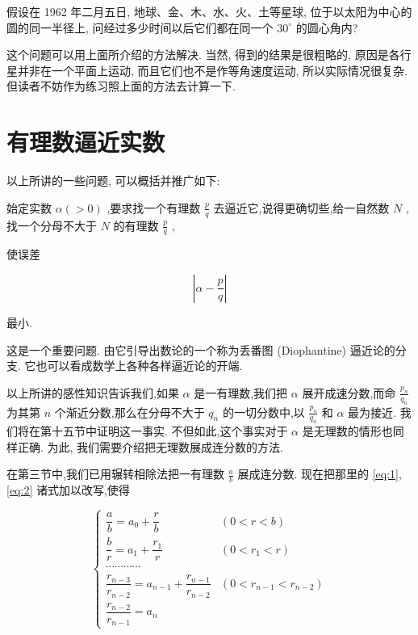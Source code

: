 \documentclass{ctexart}
\begin{document}
\begin{center}
\end{center}

假设在 1962 年二月五日, 地球、金、木、水、火、土等星球, 位于以太阳为中心的圆的同一半径上, 问经过多少时间以后它们都在同一个 \({30}^{ \circ }\) 的圆心角内?

这个问题可以用上面所介绍的方法解决. 当然, 得到的结果是很粗略的, 原因是各行星并非在一个平面上运动, 而且它们也不是作等角速度运动, 所以实际情况很复杂. 但读者不妨作为练习照上面的方法去计算一下.

\section{有理数逼近实数}

以上所讲的一些问题, 可以概括并推广如下:

始定实数 \(\alpha \left( { > 0}\right)\) ,要求找一个有理数 \(\frac{p}{q}\) 去逼近它,说得更确切些,给一自然数 \(N\) ,找一个分母不大于 \(N\) 的有理数 \(\frac{p}{q}\) ,

使误差

\[
\left| {\alpha - \frac{p}{q}}\right|
\]

最小.

这是一个重要问题. 由它引导出数论的一个称为丢番图 (Diophantine) 逼近论的分支. 它也可以看成数学上各种各样逼近论的开端.

以上所讲的感性知识告诉我们,如果 \(\alpha\) 是一有理数,我们把 \(\alpha\) 展开成速分数,而命 \(\frac{{p}_{n}}{{q}_{n}}\) 为其第 \(n\) 个渐近分数,那么在分母不大于 \({q}_{n}\) 的一切分数中,以 \(\frac{{p}_{n}}{{q}_{n}}\) 和 \(\alpha\) 最为接近. 我们将在第十五节中证明这一事实. 不但如此,这个事实对于 \(\alpha\) 是无理数的情形也同样正确. 为此, 我们需要介绍把无理数展成连分数的方法.

在第三节中,我们已用辗转相除法把一有理数 \(\frac{a}{b}\) 展成连分数. 现在把那里的 \ref{eq:1},\ref{eq:2} 诸式加以改写,使得

\[
\left\{ \begin{array}{ll} \dfrac{a}{b} = {a}_{0} + \dfrac{r}{b} & \left( {0 < r < b}\right) \\ \dfrac{b}{r} = {a}_{1} + \dfrac{{r}_{1}}{r} & \left( {0 < {r}_{1} < r}\right) \\ \cdots \cdots \cdots \cdots & \\ \dfrac{{r}_{n - 3}}{{r}_{n - 2}} = {a}_{n - 1} + \dfrac{{r}_{n - 1}}{{r}_{n - 2}} & \left( {0 < {r}_{n - 1} < {r}_{n - 2}}\right) \\ \dfrac{{r}_{n - 2}}{{r}_{n - 1}} = {a}_{n} & \end{array}\right.
\]
\end{document}
